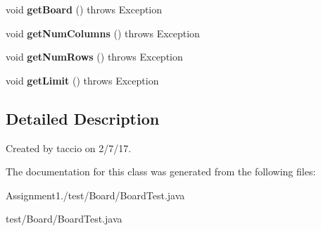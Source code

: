 \begin{DoxyCompactItemize}
\item 
\hypertarget{classBoard_1_1BoardTest_a4353e2b96f89dc3ddd8cf1a0967f2b73}{void {\bfseries get\-Board} ()  throws Exception }\label{classBoard_1_1BoardTest_a4353e2b96f89dc3ddd8cf1a0967f2b73}

\item 
\hypertarget{classBoard_1_1BoardTest_a16e4087fb6a6d9d9e94f548c51c29aec}{void {\bfseries get\-Num\-Columns} ()  throws Exception }\label{classBoard_1_1BoardTest_a16e4087fb6a6d9d9e94f548c51c29aec}

\item 
\hypertarget{classBoard_1_1BoardTest_ab3b68e75b17a6392366cee7d3e8c25cf}{void {\bfseries get\-Num\-Rows} ()  throws Exception }\label{classBoard_1_1BoardTest_ab3b68e75b17a6392366cee7d3e8c25cf}

\item 
\hypertarget{classBoard_1_1BoardTest_a442991de8ee38de866f914259adbfed9}{void {\bfseries get\-Limit} ()  throws Exception }\label{classBoard_1_1BoardTest_a442991de8ee38de866f914259adbfed9}

\end{DoxyCompactItemize}


\subsection{Detailed Description}
Created by taccio on 2/7/17. 

The documentation for this class was generated from the following files\-:\begin{DoxyCompactItemize}
\item 
Assignment1./test/\-Board/Board\-Test.\-java\item 
test/\-Board/Board\-Test.\-java\end{DoxyCompactItemize}
